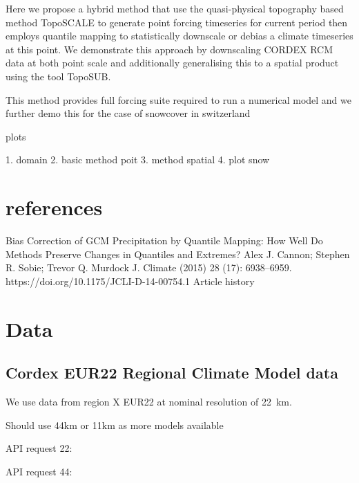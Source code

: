 \documentclass[hess, manuscript]{copernicus}
\begin{document}
Here we propose a hybrid method that use the quasi-physical topography based method TopoSCALE to generate point forcing timeseries for current period then employs quantile mapping to statistically downscale or debias a climate timeseries at this point. We demonstrate this approach by downscaling CORDEX RCM data at both point scale and additionally generalising this to a spatial product using the tool TopoSUB.

This method provides full forcing suite required to run a numerical model and we further demo this for the case of snowcover in switzerland

plots

1. domain
2. basic method poit
3. method spatial
4. plot snow

\section{references}
Bias Correction of GCM Precipitation by Quantile Mapping: How Well Do Methods Preserve Changes in Quantiles and Extremes? 
Alex J. Cannon; Stephen R. Sobie; Trevor Q. Murdock
J. Climate (2015) 28 (17): 6938–6959.
https://doi.org/10.1175/JCLI-D-14-00754.1
Article history

\section{Data}





\subsection{Cordex EUR22 Regional Climate Model data}
We use data from region X EUR22 at nominal resolution of 22~km.

Should use 44km or 11km as more models available

API request 22:

API request 44:
\end{document}

